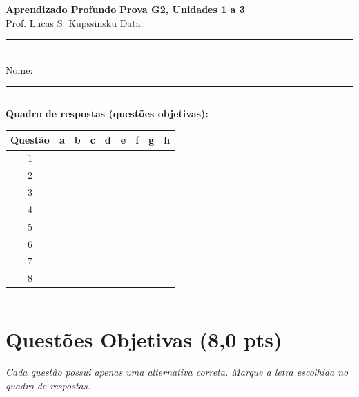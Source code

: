 \documentclass[11pt,a4paper]{article}
\begin{document}
{\Large\bfseries Aprendizado Profundo} \hfill \textbf{Prova G2, Unidades 1 a 3}\\
Prof. Lucas S. Kupssinskü \hfill Data: \rule{3cm}{0.4pt}\\[0.4em]
Nome: \rule{12cm}{0.4pt}

\rule{\linewidth}{0.8pt}

\textbf{Quadro de respostas (questões objetivas):}\\[0.3em]
\begin{center}
\begin{tabular}{|c|c|c|c|c|c|c|c|c|}
\hline
\textbf{Questão} & \textbf{a} & \textbf{b} & \textbf{c} & \textbf{d} & \textbf{e} & \textbf{f} & \textbf{g} & \textbf{h} \\\hline
1 & & & & & & & & \\\hline
2 & & & & & & & & \\\hline
3 & & & & & & & & \\\hline
4 & & & & & & & & \\\hline
5 & & & & & & & & \\\hline
6 & & & & & & & & \\\hline
7 & & & & & & & & \\\hline
8 & & & & & & & & \\\hline
\end{tabular}
\end{center}

\rule{\linewidth}{0.4pt}

\section*{Questões Objetivas (8{,}0 pts)}
\textit{Cada questão possui apenas uma alternativa correta. Marque a letra escolhida no quadro de respostas.}
\end{document}
